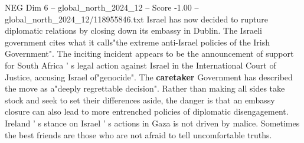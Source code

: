 \begin{textsample}{NEG Dim 6 – global\_north\_2024\_12 – Score -1.00 – global\_north\_2024\_12/118955846.txt}
Israel has now decided to rupture diplomatic relations by closing down its embassy in Dublin.
The Israeli government cites what it calls"the extreme anti-Israel policies of the Irish Government".
The inciting incident appears to be the announcement of support for South Africa ' s legal action against Israel in the International Court of Justice, accusing Israel of"genocide".
The \textbf{caretaker} Government has described the move as a"deeply regrettable decision".
Rather than making all sides take stock and seek to set their differences aside, the danger is that an embassy closure can also lead to more entrenched policies of diplomatic disengagement.
Ireland ' s stance on Israel ' s actions in Gaza is not driven by malice.
Sometimes the best friends are those who are not afraid to tell uncomfortable truths.

\end{textsample}
